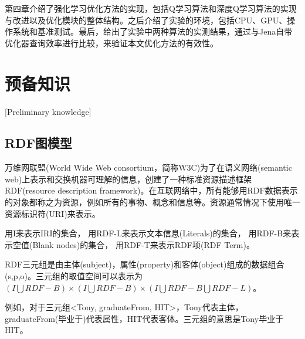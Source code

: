 第四章介绍了强化学习优化方法的实现，包括Q学习算法和深度Q学习算法的实现与改进以及优化模块的整体结构。之后介绍了实验的环境，包括CPU、GPU、操作系统和基准测试。最后，给出了实验中两种算法的实测结果，通过与Jena自带优化器查询效率进行比较，来验证本文优化方法的有效性。

\chapter{预备知识}[Preliminary knowledge]

\section{RDF图模型}

万维网联盟(World Wide Web consortium，简称W3C)为了在语义网络(semantic web)上表示和交换机器可理解的信息，创建了一种标准资源描述框架RDF(resource description framework)。在互联网络中，所有能够用RDF数据表示的对象都称之为资源，例如所有的事物、概念和信息等。资源通常情况下使用唯一资源标识符(URI)来表示。

 \begin{definition}    
    用I来表示IRI的集合，
    用RDF-L来表示文本信息(Literals)的集合，
    用RDF-B来表示空值(Blank nodes)的集合，
    用RDF-T来表示RDF项(RDF Term)。
\end{definition}

\begin{definition}[（RDF三元组）]    
    RDF三元组是由主体(subject)，属性(property)和客体(object)组成的数据组合(s,p,o)。三元组的取值空间可以表示为$(I\bigcup RDF-B)\times(I\bigcup RDF-B)\times(I\bigcup RDF-B\bigcup RDF-L)$。
    
    例如，对于三元组<Tony, graduateFrom, HIT>，Tony代表主体，graduateFrom(毕业于)代表属性，HIT代表客体。三元组的意思是Tony毕业于HIT。
\end{definition}

